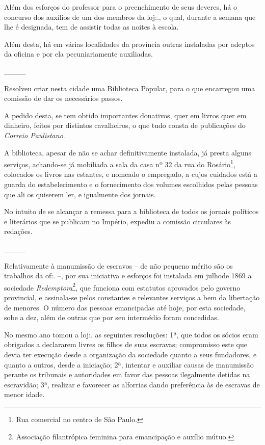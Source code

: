 {Além dos esforços do professor para o preenchimento de seus deveres, há
o concurso dos auxílios de um dos membros da loj:., o qual, durante a
semana que lhe é designada, tem de assistir todas as noites à escola.

Além desta, há em várias localidades da província outras instaladas por
adeptos da oficina e por ela pecuniariamente auxiliadas.

\_\_\_\_

Resolveu criar nesta cidade uma Biblioteca Popular, para o que
encarregou uma comissão de dar os necessários passos.

A pedido desta, se tem obtido importantes donativos, quer em livros quer
em dinheiro, feitos por distintos cavalheiros, o que tudo consta de
publicações do \emph{Correio Paulistano}.

A biblioteca, apesar de não se achar definitivamente instalada, já
presta alguns serviços, achando-se já mobiliada a sala da casa nº 32 da
rua do Rosário\footnote{ Rua comercial no centro de São Paulo.},
colocados os livros nas estantes, e nomeado o empregado, a cujos
cuidados está a guarda do estabelecimento e o fornecimento dos volumes
escolhidos pelas pessoas que ali os quiserem ler, e igualmente dos
jornais.

No intuito de se alcançar a remessa para a biblioteca de todos os
jornais políticos e literários que se publicam no Império, expediu a
comissão circulares às redações.

\_\_\_\_

Relativamente à manumissão de escravos -- de não pequeno mérito são os
trabalhos da of:. --, por sua iniciativa e esforços foi instalada em
julhode 1869 a sociedade \emph{Redemptora}\footnote{ Associação
  filantrópica feminina para emancipação e auxílio mútuo.}, que funciona
com estatutos aprovados pelo governo provincial, e assinala-se pelos
constantes e relevantes serviços a bem da libertação de menores. O
número das pessoas emancipadas até hoje, por esta sociedade, sobe a dez,
além de outras que por seu intermédio foram concedidas.

No mesmo ano tomou a loj:. as seguintes resoluções: 1ª, que todos os
sócios eram obrigados a declararem livres os filhos de suas escravas;
compromisso este que devia ter execução desde a organização da sociedade
quanto a seus fundadores, e quanto a outros, desde a iniciação; 2ª,
intentar e auxiliar causas de manumissão perante os tribunais e
autoridades em favor das pessoas ilegalmente detidas na escravidão; 3ª,
realizar e favorecer as alforrias dando preferência às de escravas de
menor idade.

}
